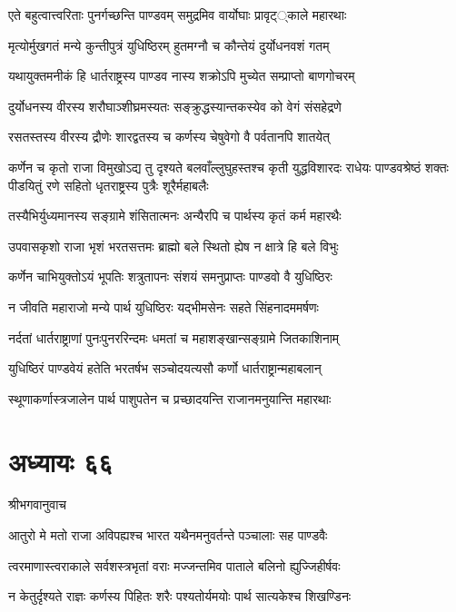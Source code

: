 \twolineshloka
{एते बहुत्वात्त्वरिताः पुनर्गच्छन्ति पाण्डवम्}
{समुद्रमिव वार्योघाः प्रावृट््काले महारथाः}


\twolineshloka
{मृत्योर्मुखगतं मन्ये कुन्तीपुत्रं युधिष्ठिरम्}
{हुतमग्नौ च कौन्तेयं दुर्योधनवशं गतम्}


\twolineshloka
{यथायुक्तमनीकं हि धार्तराष्ट्रस्य पाण्डव}
{नास्य शक्रोऽपि मुच्येत सम्प्राप्तो बाणगोचरम्}


\twolineshloka
{दुर्योधनस्य वीरस्य शरौघाञ्शीघ्रमस्यतः}
{सङ्क्रुद्धस्यान्तकस्येव को वेगं संसहेद्रणे}


\twolineshloka
{रसतस्तस्य वीरस्य द्रौणेः शारद्वतस्य च}
{कर्णस्य चेषुवेगो वै पर्वतानपि शातयेत्}


कर्णेन च कृतो राजा विमुखोऽद्य तु दृश्यते
\threelineshloka
{बलवाँल्लुघुहस्तश्च कृती युद्धविशारदः}
{राधेयः पाण्डवश्रेष्ठं शक्तः पीडयितुं रणे}
{सहितो धृतराष्ट्रस्य पुत्रैः शूरैर्महाबलैः}


\twolineshloka
{तस्यैभिर्युध्यमानस्य सङ्ग्रामे शंसितात्मनः}
{अन्यैरपि च पार्थस्य कृतं कर्म महारथैः}


\twolineshloka
{उपवासकृशो राजा भृशं भरतसत्तमः}
{ब्राह्मो बले स्थितो ह्येष न क्षात्रे हि बले विभुः}


\twolineshloka
{कर्णेन चाभियुक्तोऽयं भूपतिः शत्रुतापनः}
{संशयं समनुप्राप्तः पाण्डवो वै युधिष्ठिरः}


\twolineshloka
{न जीवति महाराजो मन्ये पार्थ युधिष्ठिरः}
{यद्भीमसेनः सहते सिंहनादममर्षणः}


\twolineshloka
{नर्दतां धार्तराष्ट्राणां पुनःपुनररिन्दमः}
{धमतां च महाशङ्खान्सङ्ग्रामे जितकाशिनाम्}


\twolineshloka
{युधिष्ठिरं पाण्डवेयं हतेति भरतर्षभ}
{सञ्चोदयत्यसौ कर्णो धार्तराष्ट्रान्महाबलान्}


\twolineshloka
{स्थूणाकर्णास्त्रजालेन पार्थ पाशुपतेन च}
{प्रच्छादयन्ति राजानमनुयान्ति महारथाः}


\chapter{अध्यायः ६६}
\twolineshloka
{श्रीभगवानुवाच}
{}


\twolineshloka
{आतुरो मे मतो राजा अविपह्यश्च भारत}
{यथैनमनुवर्तन्ते पञ्चालाः सह पाण्डवैः}


\twolineshloka
{त्वरमाणास्त्वराकाले सर्वशस्त्रभृतां वराः}
{मज्जन्तमिव पाताले बलिनो ह्युज्जिहीर्षवः}


\twolineshloka
{न केतुर्दृश्यते राज्ञः कर्णस्य पिहितः शरैः}
{पश्यतोर्यमयोः पार्थ सात्यकेश्च शिखण्डिनः}



